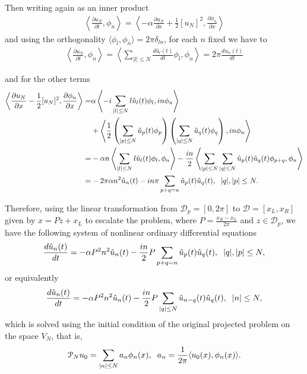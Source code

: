 		Then writing again as an inner product
		\begin{align*}
			\left\langle \frac{\partial u_N}{\partial t}, \phi_n  \right\rangle = \left\langle - \alpha \frac{\partial u_N}{\partial x} + \frac{1}{2} [u_N]^2, \frac{\partial \phi_n}{\partial x}  \right\rangle
		\end{align*}
		and using the orthogonality $\langle \phi_l, \phi_n \rangle = 2 \pi \delta_{ln}$, for each $n$ fixed we have to
		\begin{align*}
			\left\langle \frac{\partial u_N}{\partial t}, \phi_n  \right\rangle = \left\langle \displaystyle \sum_{ |l| \leq N} \frac{d \hat{u}_l (t)}{dt} \phi_l, \phi_n  \right\rangle = 2 \pi \frac{d \hat{u}_n (t)}{dt}
		\end{align*}
		
		\noindent and for the other terms
		\begin{align*}
			\left\langle \frac{\partial u_N}{\partial x} - \frac{1}{2} [u_N]^2, \frac{\partial \phi_n}{\partial x}  \right\rangle = & \alpha \left\langle - i \displaystyle \sum_{ |l| \leq N} l \hat{u}_l (t) \phi_l, in \phi_n \right\rangle \\
			&+ \left\langle\frac{1}{2} \left( \sum_{ |p| \leq N} \hat{u}_p (t) \phi_p \right) \left( \sum_{ |q| \leq N} \hat{u}_q (t) \phi_q \right), in \phi_n \right\rangle \\
			=&  - \alpha n \left\langle  \displaystyle \sum_{ |l| \leq N} l \hat{u}_l (t) \phi_l, \phi_n \right\rangle - \frac{in}{2} \left\langle \sum_{ |p| \leq N} \sum_{ |q| \leq N} \hat{u}_p (t) \hat{u}_q (t) \phi_{p + q}, \phi_n \right \rangle \\
			=& -2 \pi \alpha n^2 \hat{u}_n (t) - in \pi \sum_{ p + q = n} \hat{u}_p (t) \hat{u}_q (t), \hspace{2mm} |q|, |p| \leq N.
		\end{align*}
		
		\noindent Therefore, using the linear transformation from $\mathcal{D}_p = [0, 2 \pi]$ to $\mathcal{D} = [x_L, x_R]$ given by $x = P z + x_L$ to escalate the problem, where $P = \frac{x_R - x_L}{2 \pi}$ and $z \in \mathcal{D}_p$, we have the following system of nonlinear ordinary differential equations
		\begin{align}
		\label{Galerkin_Nonlinear}	
			\frac{d \hat{u}_n (t)}{dt} = - \alpha P^2 n^2 \hat{u}_n (t) - \frac{in}{2} P \sum_{ p + q = n} \hat{u}_p (t) \hat{u}_q (t), \hspace{2mm} |q|, |p| \leq N, 
		\end{align}
		or equivalently
		\begin{align*}
			\frac{d \hat{u}_n (t)}{dt} = - \alpha P^2 n^2 \hat{u}_n (t) - \frac{in}{2} P \sum_{|q| \leq N} \hat{u}_{n - q} (t) \hat{u}_q (t), \hspace{2mm} |n| \leq N, 
		\end{align*}
		which is solved using the initial condition of the original projected problem on the space $V_N$, that is,
		\begin{align*}
			\mathcal{P}_N u_0 = \displaystyle \sum_{|n| \leq N} a_n \phi_n (x), \hspace{2mm} a_n = \frac{1}{2 \pi} \langle u_0 (x), \phi_n (x) \rangle.   
		\end{align*}
		
